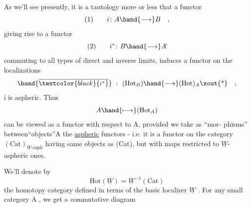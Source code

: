 As we'll see presently, it is a tautology more or less that a
functor
\[ \text{(1)} \qquad i\colon A \hand{\longrightarrow} B \quad , \]
giving rise to a functor
\[ \text{(2)} \qquad i^{*}\colon B\hat{} \hand{\longrightarrow} A\hat{} \]
\hand{(}commuting to all types of direct and inverse limits,\hand{)} induces a functor
on the localizations
\[ \hand{\overline{\textcolor{black}{i^{*}}}} \ : \ (\mathrm{Hot}_{B}) \hand{\longrightarrow} (\mathrm{Hot})_{A}\text{\xout{*}} \quad , \]
  i is  aspheric. Thus
\[ A \hand{\longmapsto} (\mathrm{Hot}_{A}) \]
can be viewed as a functor with respect to A, provided we take as ``mor-%
phisms'' between``objects''A the \uline{aspheric} functors  - i.e. it is a functor
on the category    $(\mathrm{Cat})_{\underline{W}\text{-asph}}$  having same objects as (Cat),
but with maps restricted to  $\underline{W}$-aspheric ones.

We'll denote by
\[ \mathrm{Hot}(\underline{W}) = \underline{W}^{-1}(\mathrm{Cat}) \]
the homotopy category defined in terms of the basic localizer $\underline{W}$ . For
any small category A , we get a commutative diagram

